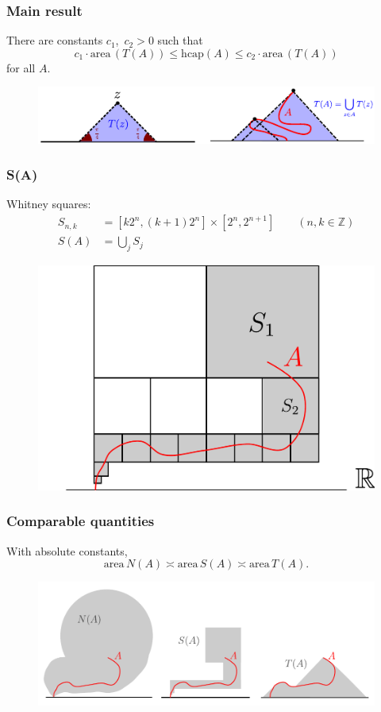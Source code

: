 \documentclass[xcolor=pdftex,dvipsnames,table]{beamer}
\newcommand{\bbZ}{\mathbb{Z}}
\newcommand{\area}{\text{area}\,}
\newcommand{\hcap}{\text{hcap}}
\theoremstyle{definition}
\begin{document}
\begin{frame}
  \frametitle{Main result}
  \begin{theorem}
    There are constants $c_1$,~$c_2 > 0$ such that
    \[
        c_1 \cdot \area(T(A)) \leq \hcap(A) \leq c_2 \cdot \area(T(A))
    \]
    for all $A$.
  \end{theorem}
  \vspace{-0.2in}
  \begin{figure}
    \includegraphics[scale=1.3]{figures/T(A).pdf}
  \end{figure}
\end{frame}

\begin{frame}
  \frametitle{S(A)}
  Whitney squares: 
  \[
      \begin{aligned}
          S_{n,k} &= [k 2^n, (k+1) 2^n] \times [2^n, 2^{n+1}] \qquad (n, k \in \bbZ)\\
          S(A) &= \bigcup_{j} S_j
      \end{aligned}
  \]
  \begin{figure}
    \includegraphics[scale=0.4]{figures/S(A).pdf}
  \end{figure}
\end{frame}


\begin{frame}
  \frametitle{Comparable quantities}
  With absolute constants,
  \[
    \area N(A) \asymp \area S(A) \asymp \area T(A).
  \]
  \begin{figure}
    \includegraphics[scale=0.6]{figures/geomQuantity.pdf}
  \end{figure}
\end{frame}
\end{document}
